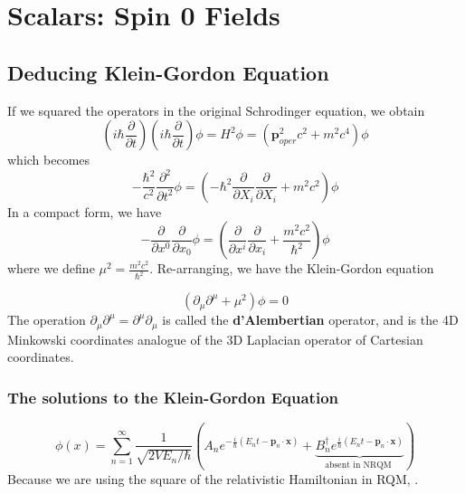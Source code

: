 \chapter{Scalars: Spin 0 Fields}
\section{Deducing Klein-Gordon Equation}
If we squared the operators in the original Schrodinger equation, we obtain
\begin{equation}
\left(i \hbar \frac{\partial}{\partial t}\right)\left(i \hbar \frac{\partial}{\partial t}\right) \phi=H^{2} \phi=\left(\mathbf{p}_{o p e r}^{2} c^{2}+m^{2} c^{4}\right) \phi
\end{equation}
which becomes
\begin{equation}
-\frac{\hbar^{2}}{c^{2}} \frac{\partial^{2}}{\partial t^{2}} \phi=\left(-\hbar^{2} \frac{\partial}{\partial X_{i}} \frac{\partial}{\partial X_{i}}+m^{2} c^{2}\right) \phi
\end{equation}
In a compact form, we have
\begin{equation}
-\frac{\partial}{\partial x^{0}} \frac{\partial}{\partial x_{0}} \phi=\left(\frac{\partial}{\partial x^{i}} \frac{\partial}{\partial x_{i}}+\frac{m^{2} c^{2}}{\hbar^{2}}\right) \phi
\end{equation}
where we define $\mu^2=\frac{m^{2} c^{2}}{\hbar^{2}}$. Re-arranging, we have the Klein-Gordon equation
\begin{qt}
    \begin{equation}
\left(\partial_{\mu} \partial^{\mu}+\mu^{2}\right) \phi=0
\end{equation}
The operation $\partial_{\mu} \partial^{\mu}=\partial^{\mu} \partial_{\mu}$ is called the \textbf{d'Alembertian} operator, and is the 4D Minkowski coordinates analogue of the 3D Laplacian operator of Cartesian coordinates.
\end{qt}
\subsection{The solutions to the Klein-Gordon Equation}
\begin{equation}
\phi(x)=\sum_{n=1}^{\infty} \frac{1}{\sqrt{2 V E_{n} / \hbar}}\left(A_{n} e^{-\frac{i}{\hbar}\left(E_{n} t-\mathbf{p}_{n} \cdot \mathbf{x}\right)}+\underbrace{B_{n}^{\dagger} e^{\frac{i}{\hbar}\left(E_{n} t-\mathbf{p}_{n} \cdot \mathbf{x}\right)}}_{\text {absent in NRQM }}\right)
\end{equation}
Because we are using the square of the relativistic Hamiltonian in RQM, .


